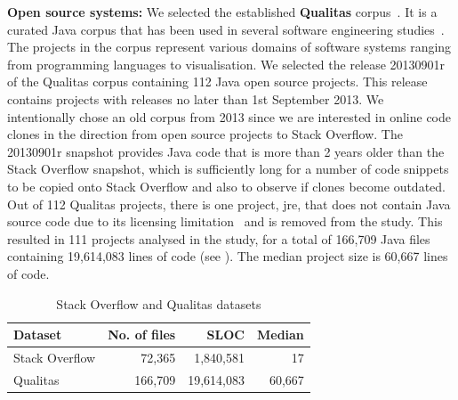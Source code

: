 \documentclass[10pt,journal,compsoc]{IEEEtran}
\begin{document}
\textbf{Open source systems: }
We selected the established \textbf{Qualitas} corpus~\cite{QualitasCorpus}. It is a curated Java corpus that has been used in several
software engineering
studies~\cite{Taube-Schock2011,Beckman2011,Vasilescu2011,Omar2012}. The
projects in the corpus represent various domains of software systems
ranging from programming languages to
visualisation. We selected the release 20130901r
of the Qualitas corpus containing 112 Java open source projects. This
release contains projects with releases no later than 1st September
2013. We intentionally chose an old corpus from 2013 since we are interested in
online code clones in the direction from open source projects to Stack
Overflow. The 20130901r snapshot provides Java code that is more than
2 years older than the Stack Overflow snapshot, which is sufficiently
long for a number of code snippets to be copied onto Stack Overflow
and also to observe if clones become outdated. Out of 112 Qualitas
projects, there is one project, \textsf{jre}, that does not contain
Java source code due to its licensing limitation~\cite{QualitasCorpus}
and is removed from the study. This resulted in 111
projects analysed in the study, for a total of 166,709 Java files containing 19,614,083
lines of code (see ). The median project size is 60,667 lines of code.

\begin{table}
	\centering
	\caption{Stack Overflow and Qualitas datasets}
	\label{tab:datasets}
	\begin{tabular}{lrrr}
		\toprule
		Dataset & No. of files & SLOC & Median \\
		\midrule
		Stack Overflow & 72,365 & 1,840,581 & 17 \\ 
		Qualitas &  166,709 & 19,614,083 & 60,667 \\ 
		\bottomrule
	\end{tabular} 
\end{table}
\end{document}
